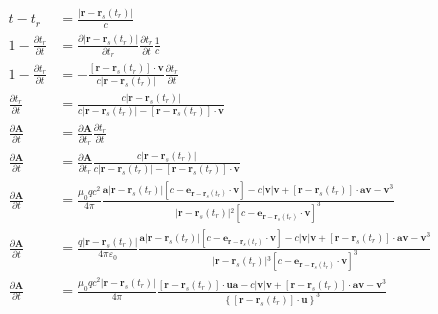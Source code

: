 \begin{align*}
    t-t_r&=\frac{|\boldsymbol{r} -\boldsymbol{r}_s(t_r)|}{c}\\
    1-\frac{\partial t_r}{\partial t}&=\frac{\partial |\boldsymbol{r} -\boldsymbol{r}_s(t_r)|}{\partial t_r}\frac{\partial t_r}{\partial t}\frac{1}{c}\\
    1-\frac{\partial t_r}{\partial t}&=-\frac{\left[\boldsymbol{r} -\boldsymbol{r}_s(t_r)\right]\cdot\boldsymbol{v}}{c|\boldsymbol{r} -\boldsymbol{r}_s(t_r)|}\frac{\partial t_r}{\partial t}\\
    \frac{\partial t_r}{\partial t}&=\frac{c|\boldsymbol{r} -\boldsymbol{r}_s(t_r)|}{c|\boldsymbol{r} -\boldsymbol{r}_s(t_r)|-\left[\boldsymbol{r} -\boldsymbol{r}_s(t_r)\right]\cdot\boldsymbol{v}}\\
    \frac{\partial\boldsymbol{A}}{\partial t}&=\frac{\partial\boldsymbol{A}}{\partial t_r}\frac{\partial t_r}{\partial t}\\
    \frac{\partial\boldsymbol{A}}{\partial t}&=\frac{\partial\boldsymbol{A}}{\partial t_r}\frac{c|\boldsymbol{r} -\boldsymbol{r}_s(t_r)|}{c|\boldsymbol{r} -\boldsymbol{r}_s(t_r)|-\left[\boldsymbol{r} -\boldsymbol{r}_s(t_r)\right]\cdot\boldsymbol{v}}\\
    \frac{\partial\boldsymbol{A}}{\partial t}&=\frac{\mu_0qc^2}{4\pi}\frac{\boldsymbol{a}\vert{}\boldsymbol{r} - \boldsymbol{r}_s(t_r)\vert{}\left[c-\boldsymbol{e}_{\boldsymbol{r} -\boldsymbol{r}_s(t_r)}\cdot\boldsymbol{v}\right]
    -c\vert{}\boldsymbol{v}\vert{}\boldsymbol{v}
    +\left[\boldsymbol{r} - \boldsymbol{r}_s(t_r)\right]\cdot\boldsymbol{a}\boldsymbol{v}
    -\boldsymbol{v}^3}{\vert{}\boldsymbol{r} - \boldsymbol{r}_s(t_r)\vert{}^2\left[c-\boldsymbol{e}_{\boldsymbol{r} -\boldsymbol{r}_s(t_r)}\cdot\boldsymbol{v}\right]^3}\\
    \frac{\partial\boldsymbol{A}}{\partial t}&=\frac{q\vert{}\boldsymbol{r} - \boldsymbol{r}_s(t_r)\vert{}}{4\pi\varepsilon_0}\frac{\boldsymbol{a}\vert{}\boldsymbol{r} - \boldsymbol{r}_s(t_r)\vert{}\left[c-\boldsymbol{e}_{\boldsymbol{r} -\boldsymbol{r}_s(t_r)}\cdot\boldsymbol{v}\right]
    -c\vert{}\boldsymbol{v}\vert{}\boldsymbol{v}
    +\left[\boldsymbol{r} - \boldsymbol{r}_s(t_r)\right]\cdot\boldsymbol{a}\boldsymbol{v}
    -\boldsymbol{v}^3}{\vert{}\boldsymbol{r} - \boldsymbol{r}_s(t_r)\vert{}^3\left[c-\boldsymbol{e}_{\boldsymbol{r} -\boldsymbol{r}_s(t_r)}\cdot\boldsymbol{v}\right]^3}\\
    \frac{\partial\boldsymbol{A}}{\partial t}&=\frac{\mu_0qc^2\vert{}\boldsymbol{r} - \boldsymbol{r}_s(t_r)\vert{}}{4\pi}\frac{\left[\boldsymbol{r} - \boldsymbol{r}_s(t_r)\right]\cdot\boldsymbol{u}\boldsymbol{a}
    -c\vert{}\boldsymbol{v}\vert{}\boldsymbol{v}
    +\left[\boldsymbol{r} - \boldsymbol{r}_s(t_r)\right]\cdot\boldsymbol{a}\boldsymbol{v}
    -\boldsymbol{v}^3}{\left\{\left[\boldsymbol{r} - \boldsymbol{r}_s(t_r)\right]\cdot\boldsymbol{u}\right\}^3}
\end{align*}
